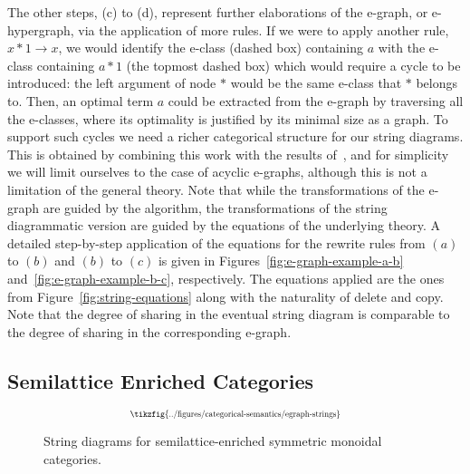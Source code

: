 The other steps, (c) to (d), represent further elaborations of the e-graph, or e-hypergraph, via the application of more rules.
If we were to apply another rule, $x * 1 \to x$, we would identify the e-class (dashed box) containing $a$ with the e-class containing $a * 1$ (the topmost dashed box) which would require a cycle to be introduced: the left argument of node $*$ would be the same e-class that $*$ belongs to.
Then, an optimal term $a$ could be extracted from the e-graph by traversing all the e-classes, where its optimality is justified by its minimal size as a graph.
To support such cycles we need a richer categorical structure for our string diagrams.
This is obtained by combining this work with the results of~\cite{ghica_rewriting_2023}, and for simplicity we will limit ourselves to the case of acyclic e-graphs, although this is not a limitation of the general theory.
Note that while the transformations of the e-graph are guided by the algorithm, the transformations of the string diagrammatic version are guided by the equations of the underlying theory.
A detailed step-by-step application of the equations for the rewrite rules from $(a)$ to $(b)$ and $(b)$ to $(c)$ is given in Figures~\ref{fig:e-graph-example-a-b} and~\ref{fig:e-graph-example-b-c}, respectively.
The equations applied are the ones from Figure~\ref{fig:string-equations} along with the naturality of delete and copy.
Note that the degree of sharing in the eventual string diagram is comparable to the degree of sharing in the corresponding e-graph.

\subsection{Semilattice Enriched Categories}

\begin{figure}
\[
	\scalebox{0.65}{
	\tikzfig{../figures/categorical-semantics/egraph-strings}
	}
\]
\captionsetup{skip=0pt, belowskip=-4ex}
\caption{String diagrams for semilattice-enriched symmetric monoidal categories.}
\label{fig:egraph-strings}
\end{figure}

